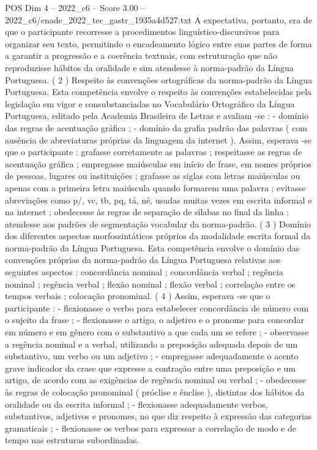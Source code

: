 \begin{textsample}{POS Dim 4 – 2022\_c6 – Score 3.00 – 2022\_c6/enade\_2022\_tec\_gastr\_1935a4d527.txt}
A expectativa, portanto, era de que o participante recorresse a procedimentos linguístico-discursivos para organizar seu texto, permitindo o encadeamento lógico entre suas partes de forma a garantir a progressão e a coerência textuais, com estruturação que não reproduzisse hábitos da oralidade e sim atendesse à norma-padrão da Língua Portuguesa. ( 2 ) Respeito às convenções ortográficas da norma-padrão da Língua Portuguesa.
Esta competência envolve o respeito às convenções estabelecidas pela legislação em vigor e consubstanciadas no Vocabulário Ortográfico da Língua Portuguesa, editado pela Academia Brasileira de Letras e avaliam -se : - domínio das regras de acentuação gráfica ; - domínio da grafia padrão das palavras ( com ausência de abreviaturas próprias da linguagem da internet ).
Assim, esperava -se que o participante : grafasse corretamente as palavras ; respeitasse as regras de acentuação gráfica ; empregasse maiúsculas em início de frase, em nomes próprios de pessoas, lugares ou instituições ; grafasse as siglas com letras maiúsculas ou apenas com a primeira letra maiúscula quando formarem uma palavra ; evitasse abreviações como p/, vc, tb, pq, tá, né, usadas muitas vezes em escrita informal e na internet ; obedecesse às regras de separação de sílabas no final da linha ; atendesse aos padrões de segmentação vocabular da norma-padrão. ( 3 ) Domínio dos diferentes aspectos morfossintáticos próprios da modalidade escrita formal da norma-padrão da Língua Portuguesa.
Esta competência envolve o domínio das convenções próprias da norma-padrão da Língua Portuguesa relativas aos seguintes aspectos : concordância nominal ; concordância verbal ; regência nominal ; regência verbal ; flexão nominal ; flexão verbal ; correlação entre os tempos verbais ; colocação pronominal. ( 4 ) Assim, esperava -se que o participante : - flexionasse o verbo para estabelecer concordância de número com o sujeito da frase ; - flexionasse o artigo, o adjetivo e o pronome para concordar em número e em gênero com o substantivo a que cada um se refere ; - observasse a regência nominal e a verbal, utilizando a preposição adequada depois de um substantivo, um verbo ou um adjetivo ; - empregasse adequadamente o acento grave indicador da crase que expresse a contração entre uma preposição e um artigo, de acordo com as exigências de regência nominal ou verbal ; - obedecesse às regras de colocação pronominal ( próclise e ênclise ), distintas dos hábitos da oralidade ou da escrita informal ; - flexionasse adequadamente verbos, substantivos, adjetivos e pronomes, no que diz respeito à expressão das categorias gramaticais ; - flexionasse os verbos para expressar a correlação de modo e de tempo nas estruturas subordinadas.

\end{textsample}
